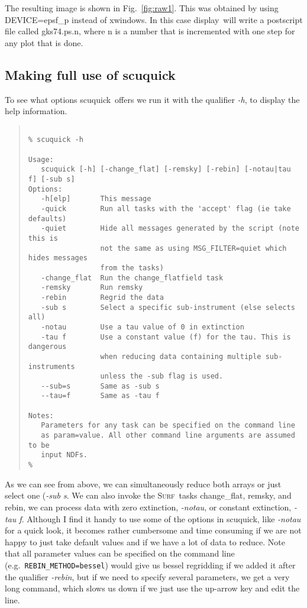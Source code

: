 \documentclass[twoside,11pt]{article}
\newenvironment{myquote}{\begin{quote}\begin{small}}{\end{small}\end{quote}}
\newcommand{\surf}{\xref{\textsc{Surf}}{sun216}{}}
\newcommand{\task}[1]{\textsf{#1}}
\newcommand{\param}[1]{\texttt{#1}}
\newcommand{\rebin}{\xref{\task{rebin}}{sun216}{REBIN}}
\newcommand{\chgflat}{\xref{\task{change\_flat}}{sun216}{CHANGE_FLAT}}
\newcommand{\scuquick}{\xref{\task{scuquick}}{sun216}{SCUQUICK}}
\newcommand{\remsky}{\xref{\task{remsky}}{sun216}{REMSKY}}
\newcommand{\display}{\xref{\task{display}}{sun95}{DISPLAY}}
\newcommand{\xref}[3]{#1}
\newcommand{\xlabel}[1]{}
\begin{document}
The resulting image is shown in Fig.\ \ref{fig:raw1}. This was obtained by
using DEVICE=epsf\_p instead of xwindows.  In this case \display\ will write a
postscript file called gks74.ps.n, where n is a number that is incremented
with one step for any plot that is done.


\subsection{\xlabel{making_full_use_of_task{scuquick}}Making full use of \task{scuquick}}

To see what options \scuquick\ offers we run it with the qualifier \textit{-h},
to display the help information.

\begin{myquote} \begin{verbatim}

% scuquick -h
 
Usage:
   scuquick [-h] [-change_flat] [-remsky] [-rebin] [-notau|tau f] [-sub s]
Options:
   -h[elp]       This message
   -quick        Run all tasks with the 'accept' flag (ie take defaults)
   -quiet        Hide all messages generated by the script (note this is 
                 not the same as using MSG_FILTER=quiet which hides messages
                 from the tasks)
   -change_flat  Run the change_flatfield task
   -remsky       Run remsky
   -rebin        Regrid the data
   -sub s        Select a specific sub-instrument (else selects all)
   -notau        Use a tau value of 0 in extinction
   -tau f        Use a constant value (f) for the tau. This is dangerous
                 when reducing data containing multiple sub-instruments
                 unless the -sub flag is used.
   --sub=s       Same as -sub s
   --tau=f       Same as -tau f
 
Notes:
   Parameters for any task can be specified on the command line
   as param=value. All other command line arguments are assumed to be
   input NDFs.
% 
\end{verbatim} \end{myquote}

As we can see from above, we can simultaneously reduce both arrays or just
select one ({\it -sub s}. We can also invoke the \surf\ tasks \chgflat,
\remsky, and \rebin, we can process data with zero extinction, {\it -notau}, or
constant extinction, {\it -tau f}. Although I find it handy to use some of the
options in \scuquick, like {\it -notau} for a quick look, it becomes rather
cumbersome and time consuming if we are not happy to just take default values
and if we have a lot of data to reduce.  Note that all parameter values can be
specified on the command line (e.g.\  \texttt{\param{REBIN\_METHOD}=bessel}) would give us
bessel regridding if we added it after the qualifier {\it -rebin}, but if we
need to specify several parameters, we get a very long command, which slows us
down if we just use the up-arrow key and edit the line. 
\end{document}
